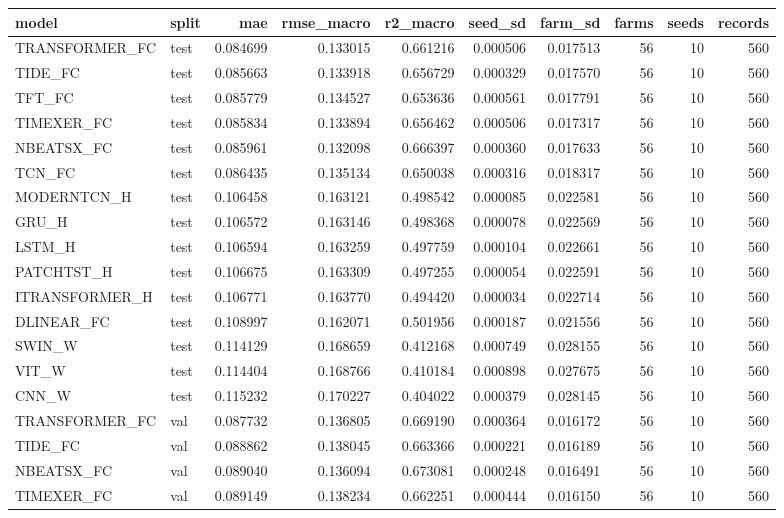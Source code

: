 \begin{tabular}{llrrrrrrrr}
\toprule
model & split & mae & rmse\_macro & r2\_macro & seed\_sd & farm\_sd & farms & seeds & records \\
\midrule
TRANSFORMER\_FC & test & 0.084699 & 0.133015 & 0.661216 & 0.000506 & 0.017513 & 56 & 10 & 560 \\
TIDE\_FC & test & 0.085663 & 0.133918 & 0.656729 & 0.000329 & 0.017570 & 56 & 10 & 560 \\
TFT\_FC & test & 0.085779 & 0.134527 & 0.653636 & 0.000561 & 0.017791 & 56 & 10 & 560 \\
TIMEXER\_FC & test & 0.085834 & 0.133894 & 0.656462 & 0.000506 & 0.017317 & 56 & 10 & 560 \\
NBEATSX\_FC & test & 0.085961 & 0.132098 & 0.666397 & 0.000360 & 0.017633 & 56 & 10 & 560 \\
TCN\_FC & test & 0.086435 & 0.135134 & 0.650038 & 0.000316 & 0.018317 & 56 & 10 & 560 \\
MODERNTCN\_H & test & 0.106458 & 0.163121 & 0.498542 & 0.000085 & 0.022581 & 56 & 10 & 560 \\
GRU\_H & test & 0.106572 & 0.163146 & 0.498368 & 0.000078 & 0.022569 & 56 & 10 & 560 \\
LSTM\_H & test & 0.106594 & 0.163259 & 0.497759 & 0.000104 & 0.022661 & 56 & 10 & 560 \\
PATCHTST\_H & test & 0.106675 & 0.163309 & 0.497255 & 0.000054 & 0.022591 & 56 & 10 & 560 \\
ITRANSFORMER\_H & test & 0.106771 & 0.163770 & 0.494420 & 0.000034 & 0.022714 & 56 & 10 & 560 \\
DLINEAR\_FC & test & 0.108997 & 0.162071 & 0.501956 & 0.000187 & 0.021556 & 56 & 10 & 560 \\
SWIN\_W & test & 0.114129 & 0.168659 & 0.412168 & 0.000749 & 0.028155 & 56 & 10 & 560 \\
VIT\_W & test & 0.114404 & 0.168766 & 0.410184 & 0.000898 & 0.027675 & 56 & 10 & 560 \\
CNN\_W & test & 0.115232 & 0.170227 & 0.404022 & 0.000379 & 0.028145 & 56 & 10 & 560 \\
TRANSFORMER\_FC & val & 0.087732 & 0.136805 & 0.669190 & 0.000364 & 0.016172 & 56 & 10 & 560 \\
TIDE\_FC & val & 0.088862 & 0.138045 & 0.663366 & 0.000221 & 0.016189 & 56 & 10 & 560 \\
NBEATSX\_FC & val & 0.089040 & 0.136094 & 0.673081 & 0.000248 & 0.016491 & 56 & 10 & 560 \\
TIMEXER\_FC & val & 0.089149 & 0.138234 & 0.662251 & 0.000444 & 0.016150 & 56 & 10 & 560 \\

\end{tabular}

